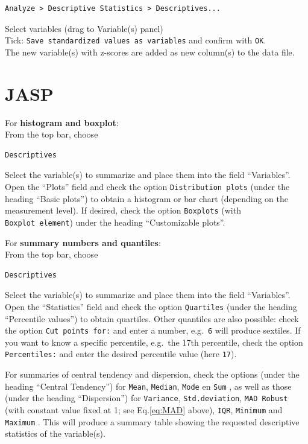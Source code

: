\documentclass[
]{book}
\begin{document}
\begin{verbatim}
Analyze > Descriptive Statistics > Descriptives...
\end{verbatim}

Select variables (drag to Variable(s) panel)\\
Tick: \texttt{Save\ standardized\ values\ as\ variables} and confirm with \texttt{OK}.\\
The new variable(s) with z-scores are added as new
column(s) to the data file.\\

\section{JASP}\label{jasp-3}

For \textbf{histogram and boxplot}:\\
From the top bar, choose

\begin{verbatim}
Descriptives
\end{verbatim}

Select the variable(s) to summarize and place them into the field ``Variables''. Open the ``Plots'' field and check the option \texttt{Distribution\ plots} (under the heading ``Basic plots'') to obtain a histogram or bar chart (depending on the measurement level).
If desired, check the option \texttt{Boxplots} (with \texttt{Boxplot\ element}) under the heading ``Customizable plots''.

For \textbf{summary numbers and quantiles}:\\
From the top bar, choose

\begin{verbatim}
Descriptives
\end{verbatim}

Select the variable(s) to summarize and place them into the field ``Variables''. Open the ``Statistics'' field and check the option \texttt{Quartiles} (under the heading ``Percentile values'') to obtain quartiles.
Other quantiles are also possible: check the option \texttt{Cut\ points\ for:} and enter a number, e.g.~\texttt{6} will produce sextiles. If you want to know a specific percentile, e.g.~the 17th percentile, check the option \texttt{Percentiles:} and enter the desired percentile value (here \texttt{17}).

For summaries of central tendency and dispersion, check the options (under the heading ``Central Tendency'') for \texttt{Mean}, \texttt{Median}, \texttt{Mode} en \texttt{Sum} , as well as those (under the heading ``Dispersion'') for \texttt{Variance}, \texttt{Std.deviation}, \texttt{MAD\ Robust} (with constant value fixed at 1; see Eq.\eqref{eq:MAD} above), \texttt{IQR}, \texttt{Minimum} and \texttt{Maximum} . This will produce a summary table showing the requested descriptive statistics of the variable(s).
\end{document}
